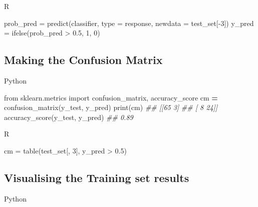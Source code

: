 \documentclass[
]{book}
\newenvironment{Shaded}{\begin{snugshade}}{\end{snugshade}}
\newcommand{\AttributeTok}[1]{\textcolor[rgb]{0.77,0.63,0.00}{#1}}
\newcommand{\BuiltInTok}[1]{#1}
\newcommand{\CommentTok}[1]{\textcolor[rgb]{0.56,0.35,0.01}{\textit{#1}}}
\newcommand{\DecValTok}[1]{\textcolor[rgb]{0.00,0.00,0.81}{#1}}
\newcommand{\FloatTok}[1]{\textcolor[rgb]{0.00,0.00,0.81}{#1}}
\newcommand{\FunctionTok}[1]{\textcolor[rgb]{0.00,0.00,0.00}{#1}}
\newcommand{\ImportTok}[1]{#1}
\newcommand{\NormalTok}[1]{#1}
\newcommand{\OperatorTok}[1]{\textcolor[rgb]{0.81,0.36,0.00}{\textbf{#1}}}
\newcommand{\OtherTok}[1]{\textcolor[rgb]{0.56,0.35,0.01}{#1}}
\newcommand{\SpecialCharTok}[1]{\textcolor[rgb]{0.00,0.00,0.00}{#1}}
\newcommand{\StringTok}[1]{\textcolor[rgb]{0.31,0.60,0.02}{#1}}
\theoremstyle{definition}
\theoremstyle{definition}
\theoremstyle{definition}
\theoremstyle{definition}
\theoremstyle{remark}
\begin{document}
R

\begin{Shaded}
\begin{Highlighting}[]
\NormalTok{prob\_pred }\OtherTok{=} \FunctionTok{predict}\NormalTok{(classifier, }\AttributeTok{type =} \StringTok{\textquotesingle{}response\textquotesingle{}}\NormalTok{, }\AttributeTok{newdata =}\NormalTok{ test\_set[}\SpecialCharTok{{-}}\DecValTok{3}\NormalTok{])}
\NormalTok{y\_pred }\OtherTok{=} \FunctionTok{ifelse}\NormalTok{(prob\_pred }\SpecialCharTok{\textgreater{}} \FloatTok{0.5}\NormalTok{, }\DecValTok{1}\NormalTok{, }\DecValTok{0}\NormalTok{)}
\end{Highlighting}
\end{Shaded}

\hypertarget{making-the-confusion-matrix}{%
\subsection{Making the Confusion Matrix}\label{making-the-confusion-matrix}}

Python

\begin{Shaded}
\begin{Highlighting}[]
\ImportTok{from}\NormalTok{ sklearn.metrics }\ImportTok{import}\NormalTok{ confusion\_matrix, accuracy\_score}
\NormalTok{cm }\OperatorTok{=}\NormalTok{ confusion\_matrix(y\_test, y\_pred)}
\BuiltInTok{print}\NormalTok{(cm)}
\CommentTok{\#\# [[65  3]}
\CommentTok{\#\#  [ 8 24]]}
\NormalTok{accuracy\_score(y\_test, y\_pred)}
\CommentTok{\#\# 0.89}
\end{Highlighting}
\end{Shaded}

R

\begin{Shaded}
\begin{Highlighting}[]
\NormalTok{cm }\OtherTok{=} \FunctionTok{table}\NormalTok{(test\_set[, }\DecValTok{3}\NormalTok{], y\_pred }\SpecialCharTok{\textgreater{}} \FloatTok{0.5}\NormalTok{)}
\end{Highlighting}
\end{Shaded}

\hypertarget{visualising-the-training-set-results-1}{%
\subsection{Visualising the Training set results}\label{visualising-the-training-set-results-1}}

Python
\end{document}
